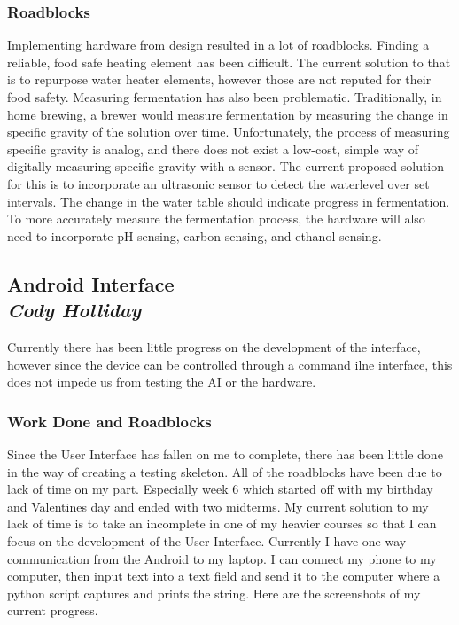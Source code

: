 \documentclass[draftclsnofoot,onecolumn,letterpaper,10pt]{IEEEtran}
\begin{document}
\subsubsection{Roadblocks}
Implementing hardware from design resulted in a lot of roadblocks.
Finding a reliable, food safe heating element has been difficult.
The current solution to that is to repurpose water heater elements, however those
are not reputed for their food safety.
Measuring fermentation has also been problematic.
Traditionally, in home brewing, a brewer would measure fermentation by measuring
the change in specific gravity of the solution over time.
Unfortunately, the process of measuring specific gravity is analog, and there does
not exist a low-cost, simple way of digitally measuring specific gravity with a
sensor.
The current proposed solution for this is to incorporate an ultrasonic sensor to
detect the waterlevel over set intervals.
The change in the water table should indicate progress in fermentation.
To more accurately measure the fermentation process, the hardware will also need
to incorporate pH sensing, carbon sensing, and ethanol sensing.

\subsection{Android Interface\\{\em\textbf{Cody Holliday}}}
Currently there has been little progress on the development of the interface, however since the device can be controlled through a command ilne interface, this does not impede us from testing the AI or the hardware.


\subsubsection{Work Done and Roadblocks}
Since the User Interface has fallen on me to complete, there has been little done in the way of creating a testing skeleton.
All of the roadblocks have been due to lack of time on my part. Especially week 6 which started off with my birthday
and Valentines day and ended with two midterms.
My current solution to my lack of time is to take an incomplete in one of my heavier courses so that I can focus on the development of the User Interface.
Currently I have one way communication from the Android to my laptop. I can connect my phone to my
computer, then input text into a text field and send it to the computer where a python script captures and prints the string.
Here are the screenshots of my current progress.
\end{document}
